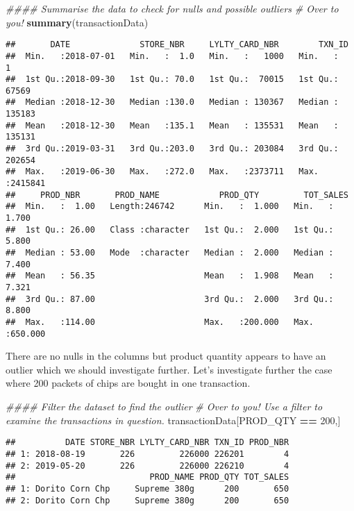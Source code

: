 \documentclass[]{article}
\newenvironment{Shaded}{\begin{snugshade}}{\end{snugshade}}
\newcommand{\CommentTok}[1]{\textcolor[rgb]{0.56,0.35,0.01}{\textit{#1}}}
\newcommand{\DecValTok}[1]{\textcolor[rgb]{0.00,0.00,0.81}{#1}}
\newcommand{\KeywordTok}[1]{\textcolor[rgb]{0.13,0.29,0.53}{\textbf{#1}}}
\newcommand{\NormalTok}[1]{#1}
\newcommand{\OperatorTok}[1]{\textcolor[rgb]{0.81,0.36,0.00}{\textbf{#1}}}
\newcommand{\StringTok}[1]{\textcolor[rgb]{0.31,0.60,0.02}{#1}}
\begin{document}
\begin{Shaded}
\begin{Highlighting}[]
\CommentTok{#### Summarise the data to check for nulls and possible outliers}
\CommentTok{# Over to you!}
\KeywordTok{summary}\NormalTok{(transactionData)}
\end{Highlighting}
\end{Shaded}

\begin{verbatim}
##       DATE              STORE_NBR     LYLTY_CARD_NBR        TXN_ID       
##  Min.   :2018-07-01   Min.   :  1.0   Min.   :   1000   Min.   :      1  
##  1st Qu.:2018-09-30   1st Qu.: 70.0   1st Qu.:  70015   1st Qu.:  67569  
##  Median :2018-12-30   Median :130.0   Median : 130367   Median : 135183  
##  Mean   :2018-12-30   Mean   :135.1   Mean   : 135531   Mean   : 135131  
##  3rd Qu.:2019-03-31   3rd Qu.:203.0   3rd Qu.: 203084   3rd Qu.: 202654  
##  Max.   :2019-06-30   Max.   :272.0   Max.   :2373711   Max.   :2415841  
##     PROD_NBR       PROD_NAME            PROD_QTY         TOT_SALES      
##  Min.   :  1.00   Length:246742      Min.   :  1.000   Min.   :  1.700  
##  1st Qu.: 26.00   Class :character   1st Qu.:  2.000   1st Qu.:  5.800  
##  Median : 53.00   Mode  :character   Median :  2.000   Median :  7.400  
##  Mean   : 56.35                      Mean   :  1.908   Mean   :  7.321  
##  3rd Qu.: 87.00                      3rd Qu.:  2.000   3rd Qu.:  8.800  
##  Max.   :114.00                      Max.   :200.000   Max.   :650.000
\end{verbatim}

There are no nulls in the columns but product quantity appears to have
an outlier which we should investigate further. Let's investigate
further the case where 200 packets of chips are bought in one
transaction.

\begin{Shaded}
\begin{Highlighting}[]
\CommentTok{#### Filter the dataset to find the outlier}
\CommentTok{# Over to you! Use a filter to examine the transactions in question.}
\NormalTok{transactionData[PROD_QTY }\OperatorTok{==}\StringTok{ }\DecValTok{200}\NormalTok{,]}
\end{Highlighting}
\end{Shaded}

\begin{verbatim}
##          DATE STORE_NBR LYLTY_CARD_NBR TXN_ID PROD_NBR
## 1: 2018-08-19       226         226000 226201        4
## 2: 2019-05-20       226         226000 226210        4
##                           PROD_NAME PROD_QTY TOT_SALES
## 1: Dorito Corn Chp     Supreme 380g      200       650
## 2: Dorito Corn Chp     Supreme 380g      200       650
\end{verbatim}
\end{document}
